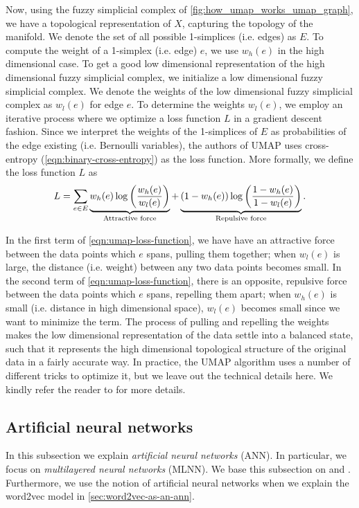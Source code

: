 Now, using the fuzzy simplicial complex of \cref{fig:how_umap_works_umap_graph}, we have a topological representation of $X$, capturing the topology of the manifold. We denote the set of all possible 1-simplices (i.e. edges) as $E$. To compute the weight of a 1-simplex (i.e. edge) $e$, we use $w_h(e)$ in the high dimensional case. To get a good low dimensional representation of the high dimensional fuzzy simplicial complex, we initialize a low dimensional fuzzy simplicial complex. We denote the weights of the low dimensional fuzzy simplicial complex as $w_l(e)$ for edge $e$. To determine the weights $w_l(e)$, we employ an iterative process where we optimize a loss function $L$ in a gradient descent fashion. Since we interpret the weights of the 1-simplices of $E$ as probabilities of the edge existing (i.e. Bernoulli variables), the authors of UMAP uses cross-entropy (\cref{eqn:binary-cross-entropy}) as the loss function. More formally, we define the loss function $L$ as
\begin{align}
    L = \sumlim{e \in E}{} \undertext{w_h(e) \log \enclp{\frac{w_h(e)}{w_l(e)}}}{Attractive force} + \undertext{(1 - w_h(e)) \log \enclp{\frac{1 - w_h(e)}{1 - w_l(e)}}}{Repulsive force}.
    \label{eqn:umap-loss-function}
\end{align}

In the first term of \cref{eqn:umap-loss-function}, we have have an attractive force between the data points which $e$ spans, pulling them together; when $w_l(e)$ is large, the distance (i.e. weight) between any two data points becomes small. In the second term of \cref{eqn:umap-loss-function}, there is an opposite, repulsive force between the data points which $e$ spans, repelling them apart; when $w_h(e)$ is small (i.e. distance in high dimensional space), $w_l(e)$ becomes small since we want to minimize the term. The process of pulling and repelling the weights makes the low dimensional representation of the data settle into a balanced state, such that it represents the high dimensional topological structure of the original data in a fairly accurate way. In practice, the UMAP algorithm uses a number of different tricks to optimize it, but we leave out the technical details here. We kindly refer the reader to \cite{2018arXivUMAP} for more details.

\subsection{Artificial neural networks}
\label{sec:artificial-neural-networks}
In this subsection we explain \textit{artificial neural networks} (ANN). In particular, we focus on \textit{multilayered neural networks} (MLNN). We base this subsection on \cite[Chapter 1]{Aggarwal18} and \cite{rong2016word2vec}. Furthermore, we use the notion of artificial neural networks when we explain the word2vec model in \cref{sec:word2vec-as-an-ann}.

